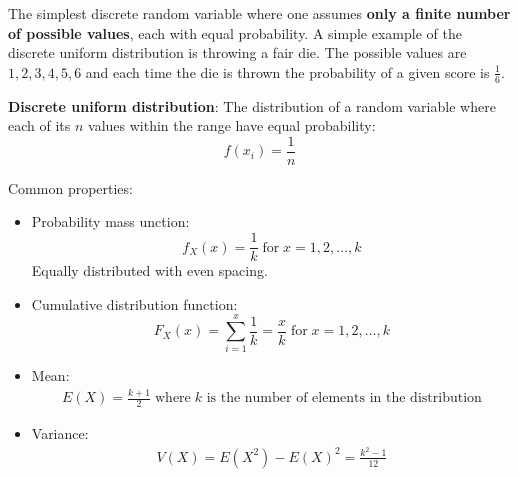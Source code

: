 \documentclass[10pt,a4paper]{article}
\begin{document}
The simplest discrete random variable where one assumes \textbf{only a finite number of possible values},
each with equal probability. A simple example of the discrete uniform distribution is throwing a fair die. The possible values are $1, 2, 3, 4, 5, 6$ and each time the die is thrown the probability of a given score is $\frac{1}{6}$.

\begin{tcolorbox}[breakable,colback=white]
\textbf{Discrete uniform distribution}: The distribution of a random variable where each of its $n$ values
within the range have equal probability:
$$
    f(x_i) = \frac{1}{n}
$$
\end{tcolorbox}

Common properties:
\begin{itemize} 
    \item Probability mass unction:
    $$
        f_X(x) = \frac{1}{k} \; \text{for}\; x = 1,2,\dots,k
    $$
    Equally distributed with even spacing.

    \item Cumulative distribution function: 
    $$
        F_X (x) = \sum_{i=1}^x \frac{1}{k} = \frac{x}{k} \; \text{for}\; x=1,2,\dots,k
    $$
    \item Mean:
    \begin{align*}
        E(X) = \frac{k+1}{2} \; \text{where}\; k \text{ is the number of elements in the distribution} 
    \end{align*}

    \item Variance:
    \begin{align*}
        V(X) = E(X^2)-E(X)^2 = \frac{k^2 - 1}{12}
    \end{align*}
\end{itemize}
\end{document}
